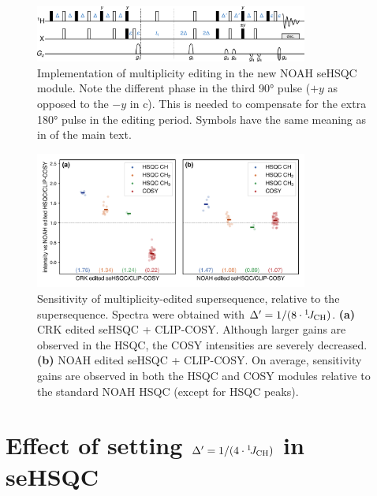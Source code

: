 \begin{figure}
    \centering
    \includegraphics[width=0.8\textwidth]{./figures/mult_edit.png}
    \caption{
        Implementation of multiplicity editing in the new NOAH seHSQC module.
        Note the different phase in the third \proton{} \ang{90} pulse ($+y$ as opposed to the $-y$ in c).
        This is needed to compensate for the extra \proton{} \ang{180} pulse in the editing period.
        Symbols have the same meaning as in  of the main text.
    }
    \label{fig:edited_sehsqc_pprog}
\end{figure}

\begin{figure}
    \centering
    \includegraphics[width=0.8\textwidth]{./figures/edited_sn_comp.png}
    \caption{
        Sensitivity of multiplicity-edited  supersequence, relative to the  supersequence.
        Spectra were obtained with $\Delta' = 1/(8\cdot\onejch)$.
        \textbf{(a)} CRK edited seHSQC + CLIP-COSY.
        Although larger gains are observed in the HSQC, the COSY intensities are severely decreased.
        \textbf{(b)} NOAH edited seHSQC + CLIP-COSY.
        On average, sensitivity gains are observed in both the HSQC and COSY modules relative to the standard NOAH HSQC (except for HSQC  peaks).
        \andro{}
    }
    \label{fig:edited_sn_comp}
\end{figure}

\section{Effect of setting \texorpdfstring{$\Delta' = 1/(4\cdot\onejch)$}{Delta' = 1/(4*1JCH)} in seHSQC}

